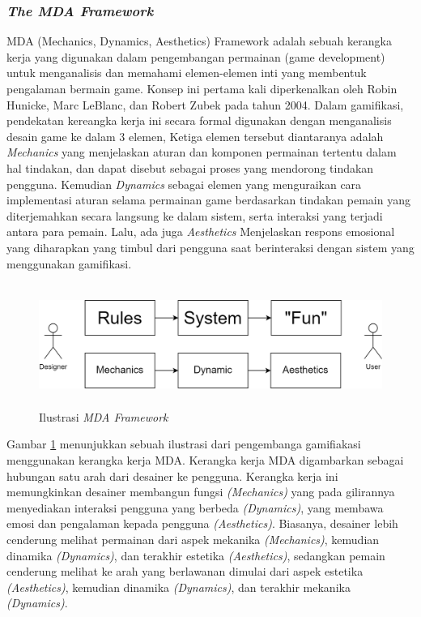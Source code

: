\subsubsection{\textit{The MDA Framework}}
MDA (Mechanics, Dynamics, Aesthetics) Framework adalah sebuah kerangka kerja yang digunakan dalam pengembangan permainan
(game development) untuk menganalisis dan memahami elemen-elemen inti yang membentuk pengalaman bermain game. 
Konsep ini pertama kali diperkenalkan oleh Robin Hunicke, Marc LeBlanc, dan Robert Zubek pada tahun 2004.
Dalam gamifikasi, pendekatan kereangka kerja ini secara formal digunakan dengan menganalisis desain game ke dalam 3 elemen,
Ketiga elemen tersebut diantaranya adalah \textit{Mechanics} yang menjelaskan aturan dan komponen permainan tertentu dalam hal tindakan, dan dapat disebut sebagai proses yang mendorong tindakan pengguna.
Kemudian \textit{Dynamics} sebagai elemen yang menguraikan cara implementasi aturan selama permainan game berdasarkan tindakan pemain yang diterjemahkan secara langsung ke dalam sistem, serta interaksi yang terjadi antara para pemain.
Lalu, ada juga \textit{Aesthetics} Menjelaskan respons emosional yang diharapkan yang timbul dari pengguna saat berinteraksi dengan sistem yang menggunakan gamifikasi.
\begin{figure}[H]
	\centering
	\includegraphics[height=4cm]{contents/chapter-2/images/MDA-framework.png}
	\caption[Caption]{Ilustrasi \textit{MDA Framework}}
	\label{Fig:Ilustrasi MDA}
\end{figure}
Gambar \ref*{Fig:Ilustrasi MDA} menunjukkan sebuah ilustrasi dari pengembanga gamifiakasi menggunakan kerangka kerja MDA.
Kerangka kerja MDA digambarkan sebagai hubungan satu arah dari desainer ke pengguna.
Kerangka kerja ini memungkinkan desainer membangun fungsi \textit{(Mechanics)} yang pada gilirannya menyediakan interaksi pengguna yang berbeda \textit{(Dynamics)}, yang membawa emosi dan pengalaman kepada pengguna \textit{(Aesthetics)}.
Biasanya, desainer lebih cenderung melihat permainan dari aspek mekanika \textit{(Mechanics)}, kemudian dinamika \textit{(Dynamics)}, dan terakhir estetika \textit{(Aesthetics)}, 
sedangkan pemain cenderung melihat ke arah yang berlawanan dimulai dari aspek estetika \textit{(Aesthetics)}, kemudian dinamika \textit{(Dynamics)}, dan terakhir mekanika \textit{(Dynamics)}.

